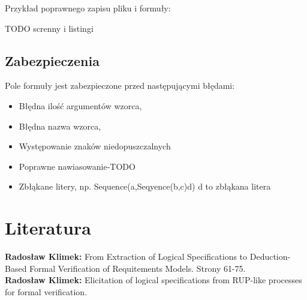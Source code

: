 \documentclass[a4paper, 11pt]{article}
\begin{document}
	Przykład poprawnego zapisu pliku i formuły:
	
	TODO screnny i listingi
	
	\subsection{Zabezpieczenia}
	Pole formuły jest zabezpieczone przed następującymi błędami:
	\begin{itemize}
	\item Błędna ilość argumentów wzorca,
	\item Błędna nazwa wzorca,
	\item Występowanie znaków niedopuszczalnych
	\item Poprawne nawiasowanie-TODO
	\item Zbłąkane litery, np. Sequence(a,Seqyence(b,c)d) d to zbłąkana litera
	\end{itemize}
	
	\section{Literatura}
	\textbf{Radosław Klimek:} From Extraction of Logical Specifications to Deduction-Based Formal Verification of Requitements Models. Strony 61-75.\\
		\textbf{Radosław Klimek:} Elicitation of logical specifications from RUP-like processes for formal verification.\\
	
	
	
\end{document}
